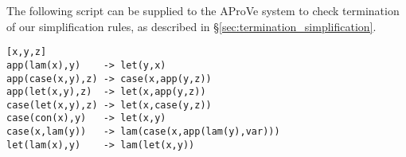 \documentclass[preprint]{sigplanconf}
\begin{document}
The following script can be supplied to the AProVe system \cite{aprove} to check termination of our simplification rules, as described in \S\ref{sec:termination_simplification}.

\begin{verbatim}
[x,y,z]
app(lam(x),y)    -> let(y,x)
app(case(x,y),z) -> case(x,app(y,z))
app(let(x,y),z)  -> let(x,app(y,z))
case(let(x,y),z) -> let(x,case(y,z))
case(con(x),y)   -> let(x,y)
case(x,lam(y))   -> lam(case(x,app(lam(y),var)))
let(lam(x),y)    -> lam(let(x,y))
\end{verbatim}




\end{document}
